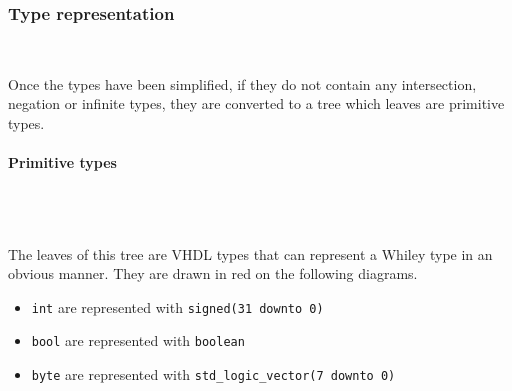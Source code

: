 \documentclass[10pt,a4paper]{article}
\newcommand{\code}{\texttt}
\renewcommand{\indent}{~\\\vspace{-.8cm}}
\begin{document}
%
%
%
%
%
%



\subsubsection{Type representation} \indent
\label{Repr}

Once the types have been simplified, if they do not contain any intersection, negation or infinite types, they are converted to a tree which leaves are primitive types.

\paragraph{Primitive types}~\\\indent

The leaves of this tree are VHDL types that can represent a Whiley type in an obvious manner. They are drawn in red on the following diagrams.

\begin{itemize}
	\item \code{int} are represented with \code{signed(31 downto 0)}
	\item \code{bool} are represented with \code{boolean}
	\item \code{byte} are represented with \code{std\_logic\_vector(7 downto 0)}
\end{itemize}
\end{document}
